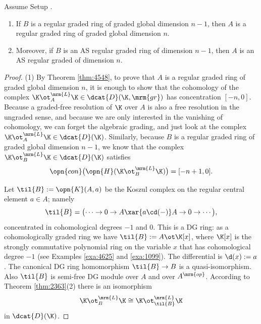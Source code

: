 \begin{thm} \label{thm:4546}
Assume Setup \tup{\ref{set:4565}}.
\begin{enumerate}
\item If  $B$ is a regular graded ring of graded global dimension $n - 1$, 
then $A$ is a regular graded ring of graded global dimension $n$. 

\item Moreover, if  $B$ is an AS regular graded ring of dimension $n - 1$,  
then $A$ is an AS regular graded of dimension $n$.
\end{enumerate}
\end{thm}

\begin{proof} \mbox{}

\smallskip \noindent
(1) By Theorem \ref{thm:4548}, to prove that $A$ is a regular graded ring
of graded global dimension $n$, 
it is enough to show that the cohomology of the complex
$\K \ot^{\mrm{L}}_{A} \K \in \dcat{D}(\K, \mrm{gr})$
has concentration $[-n, 0]$.
Because a graded-free resolution of $\K$ over $A$ is also a free 
resolution in the ungraded sense, and because we are only interested in the 
vanishing of cohomology, we can forget the algebraic grading, and just look at 
the complex
$\K \ot^{\mrm{L}}_{A} \K \in \dcat{D}(\K)$.
Similarly, because $B$ is a regular graded ring of graded global dimension 
$n - 1$, we know that the complex 
$\K \ot^{\mrm{L}}_{B} \K \in \dcat{D}(\K)$
satisfies 
\begin{equation} \label{eqn:4565}
\opn{con} \bigl( \opn{H}(\K \ot^{\mrm{L}}_{B} \K) \bigr) = [-n + 1, 0] . 
\end{equation}

Let $\til{B} := \opn{K}(A, a)$ be the Koszul complex on the regular central 
element $a \in A$; namely 
\[ \til{B}  = \bigl( \cdots \to 0 \to A \xar{a \cd (-)} A \to 0
\to \cdots \bigr) , \]
concentrated in cohomological degrees $-1$ and $0$. 
This is a DG ring: as a cohomologically graded ring we have 
$\til{B} := A \ot \K[x]$, where $\K[x]$ is the strongly commutative polynomial 
ring on the variable $x$ that has cohomological degree $-1$ 
(see Examples \ref{exa:4625} and \ref{exa:1099}). 
The differential is $\d(x) := a$. 
The canonical DG ring homomorphism $\til{B} \to B$ is a 
quasi-isomorphism. Also $\til{B}$ is semi-free DG module over $A$ and over 
$A^{\mrm{op}}$. According to Theorem \ref{thm:2363}(2) there is an isomorphism
\begin{equation} \label{eqn:4560}
\K \ot^{\mrm{L}}_{B} \K \cong \K \ot^{\mrm{L}}_{\til{B}} \K
\end{equation}
in $\dcat{D}(\K)$. 


\end{proof}
